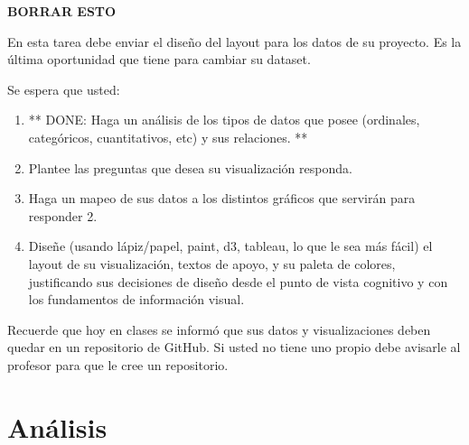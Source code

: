 \documentclass[letterpaper,10pt]{article}
\begin{document}
	\tableofcontents

	\newpage

	\begin{large}
		{\textbf{BORRAR ESTO}}
	\end{large}

	En esta tarea debe enviar el diseño del layout para los datos de su proyecto. Es la última oportunidad que tiene para cambiar su dataset.

	Se espera que usted:

	\begin{enumerate}
		\item ** DONE: Haga un análisis de los tipos de datos que posee (ordinales, categóricos, cuantitativos, etc) y sus relaciones. **
		\item Plantee las preguntas que desea su visualización responda.
		\item Haga un mapeo de sus datos a los distintos gráficos que servirán para responder 2.
		\item Diseñe (usando lápiz/papel, paint, d3, tableau, lo que le sea más fácil) el layout de su visualización, textos de apoyo, y su paleta de colores,
		justificando sus decisiones de diseño desde el punto de vista cognitivo y con los fundamentos de información visual.
	\end{enumerate}

	Recuerde que hoy en clases se informó que sus datos y visualizaciones deben quedar en un repositorio de GitHub. Si usted no tiene uno propio debe avisarle al profesor para que le cree un repositorio.

	\newpage

	\section{Análisis}
\end{document}
